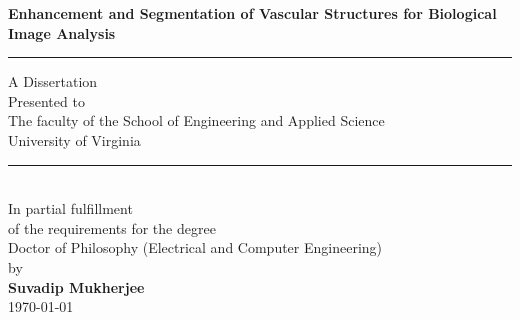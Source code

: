 \documentclass[12pt, oneside]{Thesis} %
\title{\ttitle} %
\begin{document}
\frontmatter %

\fancyhead{} 		%
\rhead{\thepage} 	%
\lhead{} 			%

\pagestyle{fancy} 	%

\newcommand{\HRule}{\rule{\linewidth}{0.5mm}} %

\hypersetup{pdfsubject=\subjectname}
\hypersetup{pdfauthor=\authornames}
\hypersetup{pdfkeywords=\keywordnames}


\begin{titlepage}
\begin{center}

\textbf{\Large Enhancement and Segmentation of Vascular Structures for Biological Image Analysis} \\[1cm] 

\HRule

A Dissertation \\ [0.2cm]
Presented to \\ [0.2cm]
The faculty of the School of Engineering and Applied Science \\ [0.2cm]
University of Virginia 
\HRule
\\[1cm]


In partial fulfillment \\ [0.2cm]
of the requirements for the degree \\ [0.2cm]
Doctor of Philosophy (Electrical and Computer Engineering) \\[1.5cm]

by \\[1cm]

\textbf{Suvadip Mukherjee} \\
\today
 
\vfill
\end{center}
\end{titlepage}


\clearpage
\pagestyle{empty}

\end{document}
